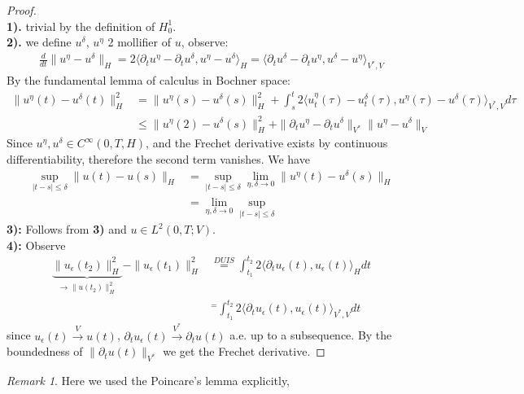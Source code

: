 \documentclass[a4paper,11pt,oneside,fleqn]{book}
\theoremstyle{definition}
\theoremstyle{remark}
\newtheorem*{remark}{Remark}
\begin{document}
 \begin{proof}\quad\\
 \textbf{1).} trivial by the definition of $H^1_0$. \\
 \textbf{2).} we define $u^\delta$, $u^\eta$ 2 mollifier of $u$, observe:
 \begin{align*}
 	\frac{d}{dt}\|u^\eta - u^\delta\|_H = 2 \langle \partial_t u^\eta - \partial_t u^\delta, u^\eta - u^\delta \rangle_{H} = \langle \partial_tu^\delta - \partial_t u^\eta, u^\delta - u^\eta \rangle_{V^*, V}
 \end{align*}
 By the fundamental lemma of calculus in Bochner space:
 \begin{align*}
 	\|u^\eta(t) - u^\delta(t)\|_H^2 &= \|u^\eta(s) - u^\delta(s)\|_H^2 + \int_s^t 2 \langle u_t^\eta(\tau) - u_t^\delta(\tau), u^\eta(\tau) - u^\delta(\tau) \rangle_{V^*, V} d\tau\\
 	&\le \|u^\eta(2) - u^\delta(s)\|_H^2 + \|\partial_t u^\eta - \partial_t u^\delta \|_{V^*} \|u^\eta - u^\delta\|_V
 \end{align*}
 Since $u^\eta, u^\delta \in C^\infty(0, T, H)$, and the Frechet derivative exists by continuous differentiability, therefore the second term vanishes. We have
 \begin{align*}
 	\sup_{|t - s| \le \delta}\|u(t) - u(s)\|_H & = \sup_{|t - s| \le \delta} \lim_{\eta, \delta \rightarrow 0}\|u^\eta(t) - u^\delta(s)\|_H  \\
 	& = \lim_{\eta, \delta \rightarrow 0} \sup_{|t -s| \le \delta}
 \end{align*}
 \textbf{3):} Follows from \textbf{3)} and $u \in L^2(0, T; V)$.\\
 \textbf{4):} Observe 
 \begin{align*}
 	\underbrace{\|u_\epsilon(t_2)\|_H^2}_{\rightarrow \|u(t_2)\|^2_H} - \|u_\epsilon(t_1)\|_H^2 
 	&\overset{DUIS}{=} \int_{t_1}^{t_2} 2\langle \partial_t u_\epsilon(t), u_\epsilon(t) \rangle_H dt\\
 	& ^= \int_{t_1}^{t_2} 2 \langle \partial_t u_\epsilon(t), u_\epsilon(t) \rangle_{V^*,V} dt 
 \end{align*}
 since $u_\epsilon(t) \overset{V}{\rightarrow} u(t)$,  $\partial_t u_\epsilon(t) \overset{V^*}{\rightarrow}\partial_t u(t)$ a.e. up to a subsequence. By the boundedness of $\|\partial_t u(t)\|_{V^*}$ we get the Frechet derivative.  
 \end{proof}
 \begin{remark}
 Here we used the Poincare's lemma explicitly, 	
 \end{remark}
\end{document}
